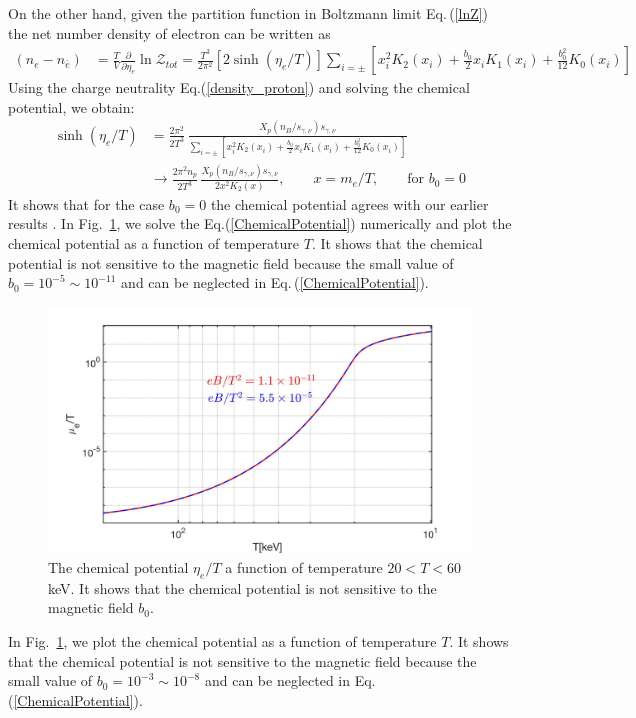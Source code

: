 \documentclass[Universe,article,submit,moreauthors,pdftex]{Definitions/mdpi}
\newcommand{\req}[1]{Eq.\,(\ref{#1})}
\newcommand*{\rf}[1]{Fig.~{\ref{#1}}}
\begin{document}
On the other hand, given the partition function in Boltzmann limit \req{lnZ} the net number density of electron can be written as
\begin{align}
\left(n_e-n_{\bar e}\right)&=\frac{T}{V}\frac{\partial}{\partial \eta_{e}}\ln\mathcal{Z}_{tot}=\frac{T^3}{2\pi^2}\left[2\sinh{(\eta_{e}/T)}\right]\sum_{i=\pm}\left[x_i^2K_2(x_i)+\frac{b_0}{2}x_i K_1(x_i)+\frac{b^2_0}{12}K_0(x_i)\right]
\end{align}
Using the charge neutrality Eq.(\ref{density_proton}) and solving the chemical potential, we obtain:
\begin{align}\label{ChemicalPotential}
\sinh{(\eta_{e}/T)}&=\frac{2\pi^2}{2T^3}\,\frac{X_p(n_B/s_{\gamma,\nu})s_{\gamma,\nu}}{\sum_{i=\pm}\left[x_i^2K_2(x_i)+\frac{b_0}{2}x_i K_1(x_i)+\frac{b^2_0}{12}K_0(x_i)\right]}\\
&\longrightarrow\frac{2\pi^2n_p}{2T^3}\,\frac{X_p(n_B/s_{\gamma,\nu})s_{\gamma,\nu}}{2x^2K_2(x)},\qquad x=m_e/T,\qquad \mathrm{for}\,\,b_0=0
\end{align}
It shows that for the case $b_0=0$ the chemical potential agrees with our earlier results \cite{Chris:2023abc}.
In {\rf{chemical_fig}}, we solve the Eq.(\ref{ChemicalPotential}) numerically and plot the  chemical potential as a function of temperature $T$. It shows that the chemical potential is not sensitive to the magnetic field because the small value of $b_0=10^{-5}\sim10^{-11}$ and can be neglected in \req{ChemicalPotential}. 

\begin{figure}[h]
\centering
\includegraphics[width=\linewidth]{ChemicalPotentialFinal_200keV.jpg}
\caption{The chemical potential $\eta_{e}/T$ a function of temperature $20<T<60$keV.  It shows that the chemical potential is not sensitive to the magnetic field $b_0$.}
\label{chemical_fig} 
\end{figure}
In {\rf{chemical_fig}}, we plot the  chemical potential as a function of temperature $T$. It shows that the chemical potential is not sensitive to the magnetic field because the small value of $b_0=10^{-3}\sim10^{-8}$ and can be neglected in \req{ChemicalPotential}. 
\end{document}
